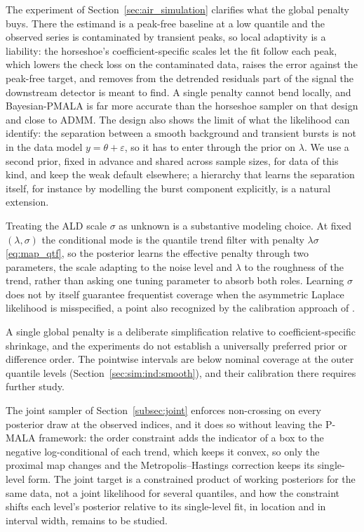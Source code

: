 The experiment of Section~\ref{sec:air_simulation} clarifies what the global penalty buys. There the estimand is a peak-free baseline at a low quantile and the observed series is contaminated by transient peaks, so local adaptivity is a liability: the horseshoe's coefficient-specific scales let the fit follow each peak, which lowers the check loss on the contaminated data, raises the error against the peak-free target, and removes from the detrended residuals part of the signal the downstream detector is meant to find. A single penalty cannot bend locally, and Bayesian-PMALA is far more accurate than the horseshoe sampler on that design and close to ADMM. The design also shows the limit of what the likelihood can identify: the separation between a smooth background and transient bursts is not in the data model $y = \theta + \varepsilon$, so it has to enter through the prior on $\lambda$. We use a second prior, fixed in advance and shared across sample sizes, for data of this kind, and keep the weak default elsewhere; a hierarchy that learns the separation itself, for instance by modelling the burst component explicitly, is a natural extension.

Treating the ALD scale $\sigma$ as unknown is a substantive modeling choice. At fixed $(\lambda, \sigma)$ the conditional mode is the quantile trend filter with penalty $\lambda\sigma$ \eqref{eq:map_qtf}, so the posterior learns the effective penalty through two parameters, the scale adapting to the noise level and $\lambda$ to the roughness of the trend, rather than asking one tuning parameter to absorb both roles. Learning $\sigma$ does not by itself guarantee frequentist coverage when the asymmetric Laplace likelihood is misspecified, a point also recognized by the calibration approach of \citet{onizuka2024fast}.

A single global penalty is a deliberate simplification relative to coefficient-specific shrinkage, and the experiments do not establish a universally preferred prior or difference order. The pointwise intervals are below nominal coverage at the outer quantile levels (Section~\ref{sec:sim:ind:smooth}), and their calibration there requires further study.

The joint sampler of Section~\ref{subsec:joint} enforces non-crossing on every posterior draw at the observed indices, and it does so without leaving the P-MALA framework: the order constraint adds the indicator of a box to the negative log-conditional of each trend, which keeps it convex, so only the proximal map changes and the Metropolis--Hastings correction keeps its single-level form. The joint target is a constrained product of working posteriors for the same data, not a joint likelihood for several quantiles, and how the constraint shifts each level's posterior relative to its single-level fit, in location and in interval width, remains to be studied.

